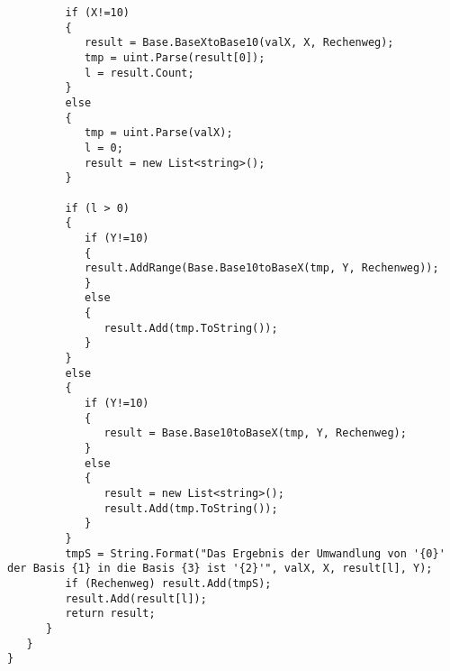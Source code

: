 \begin{lstlisting}
         if (X!=10)
         {
            result = Base.BaseXtoBase10(valX, X, Rechenweg);
            tmp = uint.Parse(result[0]);
            l = result.Count;
         }
         else
         {
            tmp = uint.Parse(valX);
            l = 0;
            result = new List<string>();
         }
         
         if (l > 0)
         {
            if (Y!=10)
            {
            result.AddRange(Base.Base10toBaseX(tmp, Y, Rechenweg));
            }
            else
            {
               result.Add(tmp.ToString());
            }
         }
         else
         {
            if (Y!=10)
            {
               result = Base.Base10toBaseX(tmp, Y, Rechenweg);
            }
            else
            {
               result = new List<string>();
               result.Add(tmp.ToString());
            }
         }
         tmpS = String.Format("Das Ergebnis der Umwandlung von '{0}' der Basis {1} in die Basis {3} ist '{2}'", valX, X, result[l], Y);
         if (Rechenweg) result.Add(tmpS);
         result.Add(result[l]);
         return result;
      }
   }
}
\end{lstlisting}